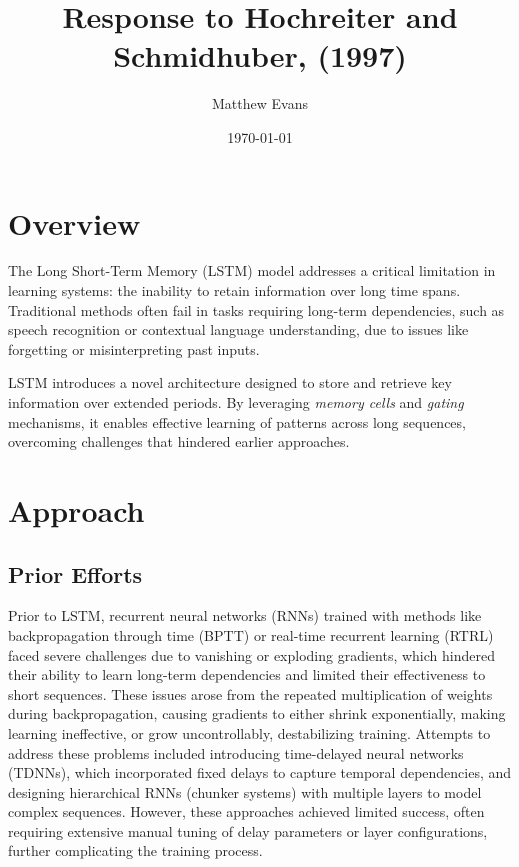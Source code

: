 \documentclass[10pt]{article}
\title{
    Response to Hochreiter and Schmidhuber, (1997) \\
}
\author{Matthew Evans}
\date{\today}
\begin{document}
\maketitle

\section*{Overview}

The Long Short-Term Memory (LSTM)\cite{6795963} model addresses a critical limitation in learning systems: the inability to retain information over long time spans. Traditional methods often fail in tasks requiring long-term dependencies, such as speech recognition or contextual language understanding, due to issues like forgetting or misinterpreting past inputs.

LSTM introduces a novel architecture designed to store and retrieve key information over extended periods. By leveraging \textit{memory cells} and \textit{gating} mechanisms, it enables effective learning of patterns across long sequences, overcoming challenges that hindered earlier approaches.


\section*{Approach}

\subsection*{Prior Efforts}

Prior to LSTM, recurrent neural networks (RNNs) trained with methods like backpropagation through time (BPTT) or real-time recurrent learning (RTRL) faced severe challenges due to vanishing or exploding gradients, which hindered their ability to learn long-term dependencies and limited their effectiveness to short sequences. These issues arose from the repeated multiplication of weights during backpropagation, causing gradients to either shrink exponentially, making learning ineffective, or grow uncontrollably, destabilizing training. Attempts to address these problems included introducing time-delayed neural networks (TDNNs)\cite{LANG199023}, which incorporated fixed delays to capture temporal dependencies, and designing hierarchical RNNs (chunker systems)\cite{6795261} with multiple layers to model complex sequences. However, these approaches achieved limited success, often requiring extensive manual tuning of delay parameters or layer configurations, further complicating the training process.
\end{document}
